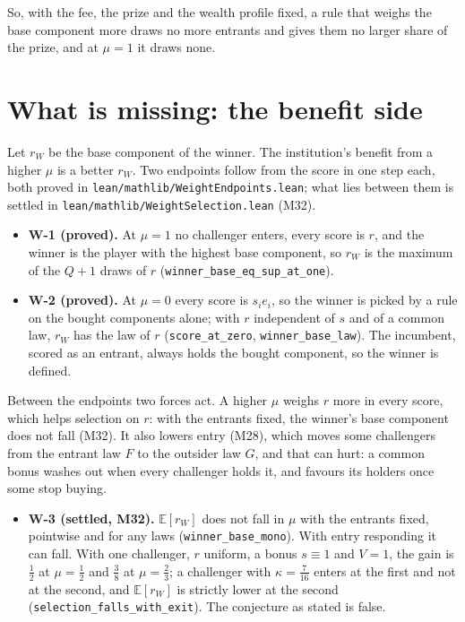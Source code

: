 \documentclass[11pt]{article}
\begin{document}
So, with the fee, the prize and the wealth profile fixed, a rule that weighs the
base component more draws no more entrants and gives them no larger share of the
prize, and at $\mu=1$ it draws none.

\section{What is missing: the benefit side}

Let $r_W$ be the base component of the winner. The institution's benefit from a
higher $\mu$ is a better $r_W$. Two endpoints follow from the score in one step
each, both proved in \texttt{lean/mathlib/WeightEndpoints.lean}; what lies
between them is settled in \texttt{lean/mathlib/WeightSelection.lean} (M32).

\begin{itemize}
\item \textbf{W-1 (proved).} At $\mu=1$ no challenger enters, every score is
  $r$, and the winner is the player with the highest base component, so $r_W$
  is the maximum of the $Q+1$ draws of $r$ (\texttt{winner\_base\_eq\_sup\_at\_one}).
\item \textbf{W-2 (proved).} At $\mu=0$ every score is $s_ie_i$, so the winner is
  picked by a rule on the bought components alone; with $r$ independent of $s$
  and of a common law, $r_W$ has the law of $r$ (\texttt{score\_at\_zero},
  \texttt{winner\_base\_law}). The incumbent, scored as an entrant, always
  holds the bought component, so the winner is defined.
\end{itemize}

Between the endpoints two forces act. A higher $\mu$ weighs $r$ more in every
score, which helps selection on $r$: with the entrants fixed, the winner's base
component does not fall (M32). It also lowers entry (M28), which moves some
challengers from the entrant law $F$ to the outsider law $G$, and that can hurt:
a common bonus washes out when every challenger holds it, and favours its
holders once some stop buying.

\begin{itemize}
\item \textbf{W-3 (settled, M32).} $\mathbb E[r_W]$ does not fall in $\mu$ with
  the entrants fixed, pointwise and for any laws (\texttt{winner\_base\_mono}).
  With entry responding it can fall. With one challenger, $r$ uniform, a bonus
  $s\equiv1$ and $V=1$, the gain is $\frac12$ at $\mu=\frac12$ and $\frac38$ at
  $\mu=\frac23$; a challenger with $\kappa=\frac7{16}$ enters at the first and
  not at the second, and $\mathbb E[r_W]$ is strictly lower at the second
  (\texttt{selection\_falls\_with\_exit}). The conjecture as stated is false.
\end{itemize}
\end{document}
